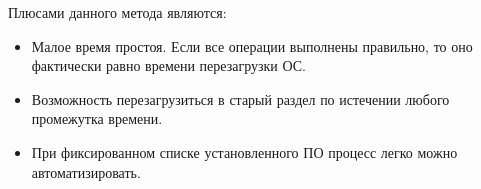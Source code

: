 \documentclass[10pt, a5paper]{article}
\begin{document}
Плюсами данного метода являются:

\begin{itemize}
  \item Малое время простоя. Если все операции выполнены правильно, то оно фактически равно времени перезагрузки ОС.
  \item Возможность перезагрузиться в старый раздел по истечении любого промежутка времени.
  \item При фиксированном списке установленного ПО процесс легко можно автоматизировать.
\end{itemize}
\end{document}
